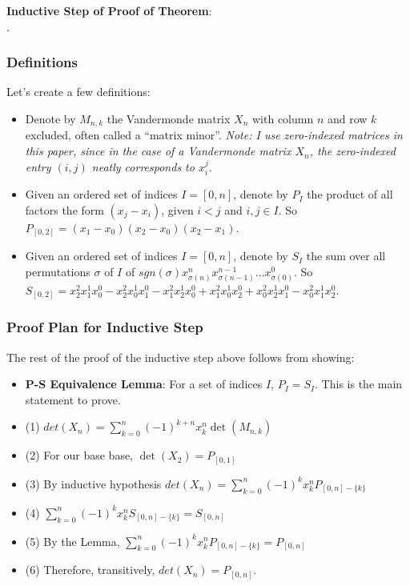 \documentclass[11pt, oneside]{article} 	%
\begin{document}
\textbf{Inductive Step of Proof of Theorem}:
\\

.

\subsubsection{Definitions} 

Let's create a few definitions: 
\begin{itemize}
\item Denote by $M_{n,k}$ the Vandermonde matrix  $X_n$ with column $n$ and row $k$ excluded, often called a ``matrix minor''.   \emph{Note: I use zero-indexed matrices in this paper, since in the case of a Vandermonde matrix $X_n$, the zero-indexed entry $(i, j)$ neatly corresponds to $x_i^j$}.
\item Given an ordered set of indices $I = [0, n]$, denote by $P_I$ the product of all factors the form $(x_j - x_i)$, given $i < j$ and $i, j \in I$.  So $P_{[0,2]} = (x_1 - x_0)(x_2-x_0)(x_2- x_1)$.
\item Given an ordered set of indices $I = [0, n]$, denote by $S_I$ the sum over all permutations $\sigma$ of $I$ of $sgn(\sigma) x_{\sigma(n)}^{n} x_{\sigma(n-1)}^{n-1} ... x_{\sigma(0)}^{0} $. So $S_{[0,2]} = x_2^2x_1^1x_0^0 - x_2^2x_0^1x_1^0 - x_1^2x_2^1x_0^0 + x_1^2x_0^1x_2^0 + x_0^2x_2^1x_1^0 - x_0^2x_1^1x_2^0$.
\end{itemize}

\subsubsection{Proof Plan for Inductive Step} 

The rest of the proof of the inductive step above follows from showing:

\begin{itemize}
\item \textbf{P-S Equivalence Lemma}: For a set of indices $I$, $P_I = S_I$.  This is the main statement to prove.
\item (1) $det(X_n) = \sum_{k=0}^n (-1)^{k+n} x_k^n\det(M_{n, k})$ 
\item (2) For our base base, $\det(X_2) = P_{[0,1]}$
\item (3) By inductive hypothesis $det(X_n) = \sum_{k=0}^n (-1)^k x_k^n P_{[0,n] - \{k\}}$
\item (4) $\sum_{k=0}^n (-1)^k x_k^n S_{[0,n] -\{k\}} = S_{[0, n]}$
\item (5) By the Lemma, $\sum_{k=0}^n (-1)^k x_k^n P_{[0,n] -\{k\}} = P_{[0, n]}$
\item (6) Therefore, transitively, $det(X_n) = P_{[0, n]}$.
\end{itemize}
\end{document}

